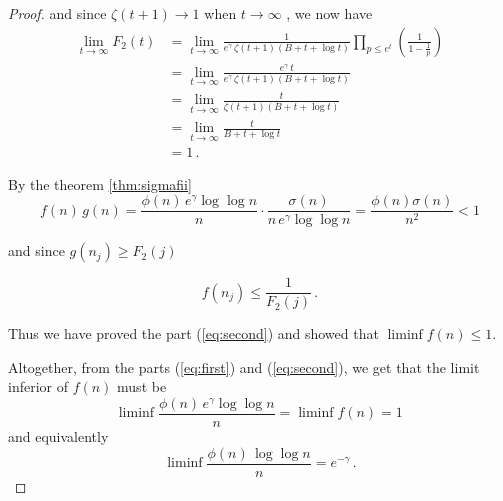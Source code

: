 \documentclass{article}
\begin{document}
\begin{theorem}
\begin{proof}
and since $\zeta(t+1)\rightarrow 1$ when $t\rightarrow\infty$ \cite{HW:theproof}, we now have
\begin{align*}
    \lim_{t \rightarrow \infty} F_2(t) & = \lim_{t \rightarrow \infty} \frac{1}{e^\gamma\,\zeta(t+1)(B+t+\log t)} \prod_{p\leq e^t} \left(\frac{1}{1-\frac{1}{p}}\right)\\
    & = \lim_{t \rightarrow \infty} \frac{e^\gamma\,t}{e^\gamma\,\zeta(t+1)(B+t+\log t)}\\
    & = \lim_{t \rightarrow \infty} \frac{t}{\zeta(t+1)(B+t+\log t)}\\
    & = \lim_{t \rightarrow \infty} \frac{t}{B+t+\log t}\\
    & = 1\,.
\end{align*}

By the theorem \ref{thm:sigmafii}
\begin{equation*}
    f(n)\,g(n) = \frac{\phi(n)\,e^\gamma \log\log n}{n} \cdot \frac{\sigma(n)}{n\,e^\gamma \log\log n} = \frac{\phi(n)\sigma(n)}{n^2}<1
\end{equation*}

and since $g(n_j) \geq F_2(j)$

\begin{equation*}
    f(n_j)\leq \frac{1}{F_2(j)}\,.
\end{equation*}

Thus we have proved the part (\ref{eq:second}) and showed that $\liminf{f(n)\leq 1}$.

Altogether, from the parts (\ref{eq:first}) and (\ref{eq:second}), we get that the limit inferior of $f(n)$ must be
\begin{equation*}
    \liminf{\frac{\phi(n)\,e^\gamma \log\log n}{n}}=\liminf{f(n)}=1\,
\end{equation*}
and equivalently
\begin{equation*}
    \liminf{\frac{\phi(n)\,\log\log n}{n}}=e^{-\gamma}\,.
\end{equation*}

\end{proof}

\end{theorem}

\clearpage
\nocite{*}
\printbibliography
\end{document}
